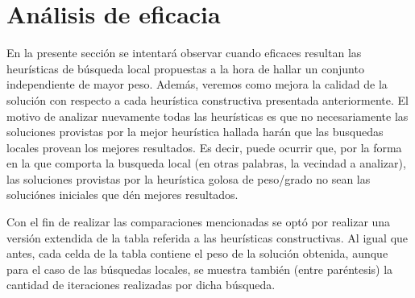 \documentclass[a4paper,11pt] {article}
\begin{document}
\section*{An\'alisis de eficacia}

En la presente sección se intentará observar cuando eficaces resultan las heurísticas de búsqueda local propuestas a la hora de hallar un conjunto independiente de mayor peso. Además, veremos como mejora la calidad de la solución con respecto a cada heurística constructiva presentada anteriormente. El motivo de analizar nuevamente todas las heurísticas es que no necesariamente las soluciones provistas por la mejor heurística hallada harán que las busquedas locales provean los mejores resultados. Es decir, puede ocurrir que, por la forma en la que comporta la busqueda local (en otras palabras, la vecindad a analizar), las soluciones provistas por la heurística golosa de peso/grado no sean las soluciónes iniciales que dén mejores resultados.

Con el fin de realizar las comparaciones mencionadas se optó por realizar una versión extendida de la tabla referida a las heurísticas constructivas. Al igual que antes, cada celda de la tabla contiene el peso de la solución obtenida, aunque para el caso de las búsquedas locales, se muestra también (entre paréntesis) la cantidad de iteraciones realizadas por dicha búsqueda.
\end{document}
